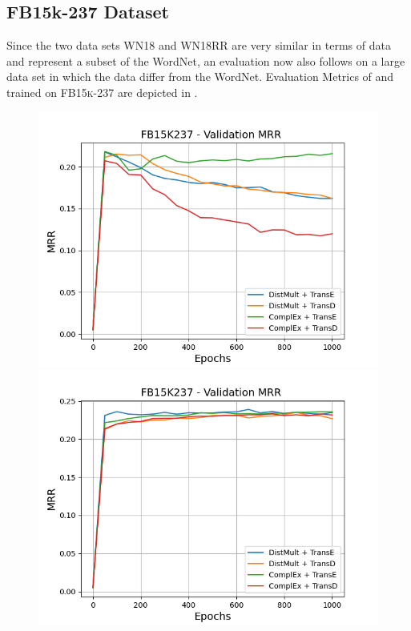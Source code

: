 \subsection{FB15k-237 Dataset}
\label{subsec:methods_fb15k237}

Since the two data sets WN18 and WN18RR are very similar in terms of data and represent a subset of the WordNet, an evaluation now also follows on a large data set in which the data differ from the WordNet.
Evaluation Metrics of \usmax and \ussoftmax trained on \textsc{FB15k-237} are depicted in .
\begin{figure}
    \centering
    \begin{minipage}{.5\textwidth}
      \centering
      \includegraphics[width=0.9\linewidth]{figures/results/gan_train/not_pretrained/uncertainty/max/entropy/fb15k237/uncertainty_fb15k237_mrrs.png}
    \end{minipage}%
    \begin{minipage}{.5\textwidth}
      \centering
      \includegraphics[width=0.9\linewidth]{figures/results/gan_train/not_pretrained/uncertainty/max_distribution/entropy/fb15k237/uncertainty_fb15k237_mrrs.png}

\end{minipage}
\end{figure}
